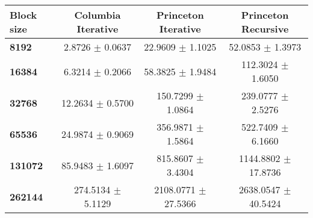\begin{tabular}{lccc}\toprule
\textbf{Block size}  & \textbf{Columbia Iterative} & \textbf{Princeton Iterative} & \textbf{Princeton Recursive}\\\midrule
\textbf{8192}  & 2.8726 $\pm$ 0.0637 & 22.9609 $\pm$ 1.1025 & 52.0853 $\pm$ 1.3973\\
\textbf{16384}  & 6.3214 $\pm$ 0.2066 & 58.3825 $\pm$ 1.9484 & 112.3024 $\pm$ 1.6050\\
\textbf{32768}  & 12.2634 $\pm$ 0.5700 & 150.7299 $\pm$ 1.0864 & 239.0777 $\pm$ 2.5276\\
\textbf{65536}  & 24.9874 $\pm$ 0.9069 & 356.9871 $\pm$ 1.5864 & 522.7409 $\pm$ 6.1660\\
\textbf{131072}  & 85.9483 $\pm$ 1.6097 & 815.8607 $\pm$ 3.4304 & 1144.8802 $\pm$ 17.8736\\
\textbf{262144} & 274.5134 $\pm$ 5.1129 & 2108.0771 $\pm$ 27.5366 & 2638.0547 $\pm$ 40.5424\\
\bottomrule
\end{tabular}
